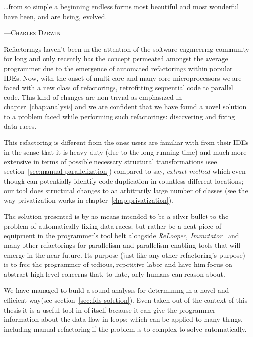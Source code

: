 \graphicspath{{content/conclusions/figures/}}

\epigraph{\ldots from so simple a beginning endless
forms most beautiful and most wonderful have been, and are being,
evolved.}%
{---\textsc{Charles Darwin}} 

Refactorings haven't been in the attention of the software engineering community
for long and only recently has the concept permeated amongst the average
programmer due to the emergence of automated refactorings within popular IDEs.
Now, with the onset of multi-core and many-core microprocessors we are faced
with a new class of refactorings, retrofitting sequential code to parallel code.
This kind of changes are non-trivial as emphasized in
chapter~\ref{chap:analysis} and we are confident that we have found a novel
solution to a problem faced while performing such refactorings: discovering and
fixing data-races.

This refactoring is different from the ones users are familiar with from their
IDEs in the sense that it is heavy-duty (due to the long running time) and much
more extensive in terms of possible necessary structural transformations (see
section~\ref{sec:manual-parallelization}) compared to say, \emph{extract method}
which even though can potentially identify code duplication in countless
different locations; our tool does structural changes to an arbitrarily large
number of classes (see the way privatization works in chapter~\ref{chap:privatization}).

The solution presented is by no means intended to be a silver-bullet to the
problem of automatically fixing data-races; but rather be a neat piece of
equipment in the programmer's tool belt alongside \emph{ReLooper,
Immutator}~\cite{ReLooper, Immutator} and many other refactorings for
parallelism and parallelism enabling tools that will emerge in the near future.
Its purpose (just like any other refactoring's purpose) is to free the
programmer of tedious, repetitive labor and have him focus on abstract high
level concerns that, to date, only humans can reason about.

We have managed to build a sound analysis for determining \lcds in a novel and
efficient way(see section~\ref{sec:ifds-solution}). Even taken out of the
context of this thesis it is a useful tool in of itself because it can give the
programmer information about the data-flow in loops; which can be applied to
many things, including manual refactoring if the problem is to complex to solve
automatically.

